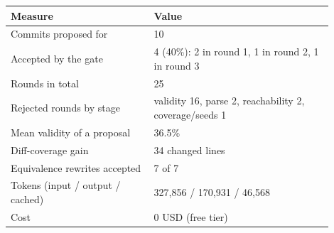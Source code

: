 \begin{tabular}{p{0.4\linewidth}p{0.5\linewidth}}
    \toprule
    Measure & Value \\
    \midrule
    Commits proposed for & 10 \\
    Accepted by the gate & 4 (40\%): 2 in round 1, 1 in round 2, 1 in round 3 \\
    Rounds in total & 25 \\
    Rejected rounds by stage & validity 16, parse 2, reachability 2, coverage/seeds 1 \\
    Mean validity of a proposal & 36.5\% \\
    Diff-coverage gain & 34 changed lines \\
    Equivalence rewrites accepted & 7 of 7 \\
    Tokens (input / output / cached) & 327{,}856 / 170{,}931 / 46{,}568 \\
    Cost & 0 USD (free tier) \\
    \bottomrule
  \end{tabular}
